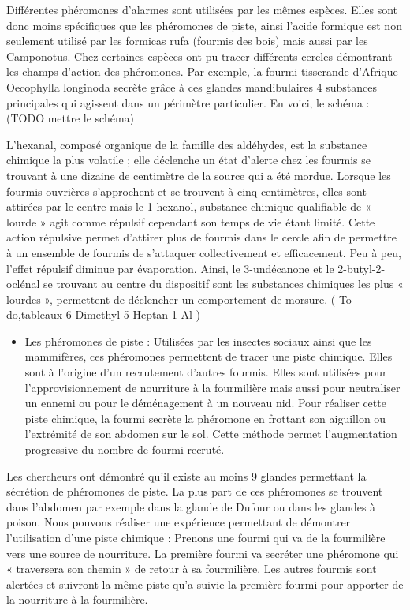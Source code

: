 Différentes phéromones d'alarmes sont utilisées par les mêmes espèces.
Elles sont donc moins spécifiques que les phéromones de piste, ainsi
l'acide formique est non seulement utilisé par les formicas rufa
(fourmis des bois) mais aussi par les Camponotus. Chez certaines espèces
ont pu tracer différents cercles démontrant les champs d'action des
phéromones. Par exemple, la fourmi tisserande d'Afrique Oecophylla
longinoda secrète grâce à ces glandes mandibulaires 4 substances
principales qui agissent dans un périmètre particulier. En voici, le
schéma : (TODO mettre le schéma)

L'hexanal, composé organique de la famille des aldéhydes, est la
substance chimique la plus volatile ; elle déclenche un état d'alerte
chez les fourmis se trouvant à une dizaine de centimètre de la source
qui a été mordue. Lorsque les fourmis ouvrières s'approchent et se
trouvent à cinq centimètres, elles sont attirées par le centre mais le
1-hexanol, substance chimique qualifiable de « lourde » agit comme
répulsif cependant son temps de vie étant limité. Cette action répulsive
permet d'attirer plus de fourmis dans le cercle afin de permettre à un
ensemble de fourmis de s'attaquer collectivement et efficacement. Peu à
peu, l'effet répulsif diminue par évaporation. Ainsi, le 3-undécanone et
le 2-butyl-2-oclénal se trouvant au centre du dispositif sont les
substances chimiques les plus « lourdes », permettent de déclencher un
comportement de morsure. ( To do,tableaux 6-Dimethyl-5-Heptan-1-Al )

\begin{itemize}
\itemsep1pt\parskip0pt

	\item
	Les phéromones de piste : Utilisées par les insectes sociaux ainsi que
	les mammifères, ces phéromones permettent de tracer une piste
	chimique. Elles sont à l'origine d'un recrutement d'autres fourmis.
	Elles sont utilisées pour l'approvisionnement de nourriture à la
	fourmilière mais aussi pour neutraliser un ennemi ou pour le
	déménagement à un nouveau nid. Pour réaliser cette piste chimique, la
	fourmi secrète la phéromone en frottant son aiguillon ou l'extrémité
	de son abdomen sur le sol. Cette méthode permet l'augmentation
	progressive du nombre de fourmi recruté.
  
\end{itemize}

Les chercheurs ont démontré qu'il existe au moins 9 glandes permettant
la sécrétion de phéromones de piste. La plus part de ces phéromones se
trouvent dans l'abdomen par exemple dans la glande de Dufour ou dans les
glandes à poison. Nous pouvons réaliser une expérience permettant de
démontrer l'utilisation d'une piste chimique : Prenons une fourmi qui va
de la fourmilière vers une source de nourriture. La première fourmi va
secréter une phéromone qui « traversera son chemin » de retour à sa
fourmilière. Les autres fourmis sont alertées et suivront la même piste
qu'a suivie la première fourmi pour apporter de la nourriture à la
fourmilière.

